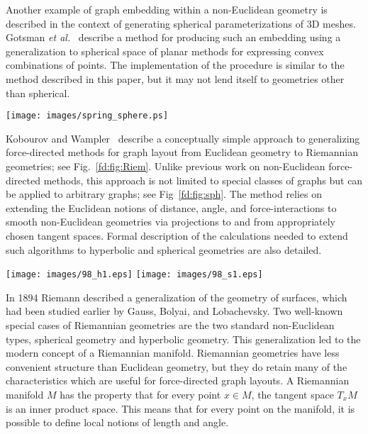 \documentclass[notitlepage,letter,11pt]{article}
\begin{document}
Another example of graph embedding within a non-Euclidean geometry is
described in the context of generating spherical parameterizations of
3D meshes. Gotsman {\em et al.}~\cite{ggs-fund-03} describe a method
for producing such an embedding using a generalization to spherical
space of planar methods for expressing convex combinations of points.
The implementation of the procedure is similar to the method described
in this paper, but it may not lend itself to geometries other than
spherical.


\begin{figure*}[t]
    \begin{center}
    \texttt{[image: images/spring\_sphere.ps]} 
\end{center}
   \caption{\small\sf An overview of a spring embedder on the sphere.}
\label{fd:fig:Riem}
\end{figure*}

Kobourov and Wampler~\cite{kw-nese-05} describe a conceptually simple
approach to generalizing force-directed methods for graph layout from
Euclidean geometry to Riemannian geometries; see Fig.~\ref{fd:fig:Riem}. Unlike previous work on
non-Euclidean force-directed methods, this approach is not limited to
special classes of graphs but can be applied to arbitrary graphs; see Fig~\ref{fd:fig:sph}. The
method relies on extending the Euclidean notions of distance, angle,
and force-interactions to smooth non-Euclidean geometries via
projections to and from appropriately chosen tangent spaces. Formal
description of the calculations needed to extend such algorithms to
hyperbolic and spherical geometries are also detailed.



\begin{figure*}[t]
\texttt{[image: images/98\_h1.eps]}
    \texttt{[image: images/98\_s1.eps]}
\caption
    {\small\sf
Layouts of a graph obtained from research papers titles in hyperbolic
space $\mathbb{H}^2$ and in spherical space $\mathbb{S}^2$~\cite{kw-nese-05}.}
\label{fd:fig:sph}
\end{figure*}

In 1894 Riemann described a generalization of the geometry of
surfaces, which had been studied earlier by Gauss, Bolyai, and
Lobachevsky. Two well-known special cases of Riemannian geometries are
the two standard non-Euclidean types, spherical geometry and
hyperbolic geometry. This generalization led to the modern concept of
a Riemannian manifold. Riemannian geometries have less convenient
structure than Euclidean geometry, but they do retain many of the
characteristics which are useful for force-directed graph layouts.  A
Riemannian manifold $M$ has the property that for every point $x \in
M$, the tangent space $T_xM$ is an inner product space. This means
that for every point on the manifold, it is possible to define local
notions of length and angle.
\end{document}
